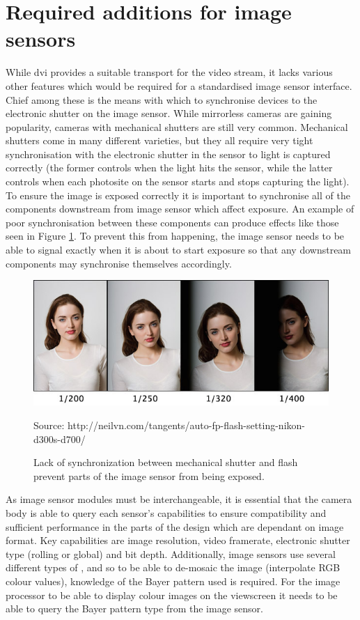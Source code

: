 \section{Required additions for image sensors}

While \gls{dvi} provides a suitable transport for the video stream, it lacks various other features which would be required for a standardised image sensor interface. Chief among these is the means with which to synchronise devices to the electronic shutter on the image sensor. While mirrorless cameras are gaining popularity, cameras with mechanical shutters are still very common. Mechanical shutters come in many different varieties, but they all require very tight synchronisation with the electronic shutter in the sensor to light is captured correctly (the former controls when the light hits the sensor, while the latter controls when each photosite on the sensor starts and stops capturing the light). To ensure the image is exposed correctly it is important to synchronise all of the components downstream from image sensor which affect exposure. An example of poor synchronisation between these components can produce effects like those seen in Figure \ref{fig:flash_unsync}. To prevent this from happening, the image sensor needs to be able to signal exactly when it is about to start exposure so that any downstream components may synchronise themselves accordingly.

\begin{figure}
  \centering
  \includegraphics[width=1\textwidth]{./img/flash_unsync.jpg}\par
Source: http://neilvn.com/tangents/auto-fp-flash-setting-nikon-d300s-d700/ 
  \caption{Lack of synchronization between mechanical shutter and flash prevent parts of the image sensor from being exposed.}
  \label{fig:flash_unsync}
\end{figure}

As image sensor modules must be interchangeable, it is essential that the camera body is able to query each sensor's capabilities to ensure compatibility and sufficient performance in the parts of the design which are dependant on image format. Key capabilities are image resolution, video framerate, electronic shutter type (rolling or global) and bit depth. Additionally, image sensors use several different types of , and so to be able to de-mosaic the image (interpolate RGB colour values), knowledge of the Bayer pattern used is required. For the image processor to be able to display colour images on the viewscreen it needs to be able to query the Bayer pattern type from the image sensor. 

